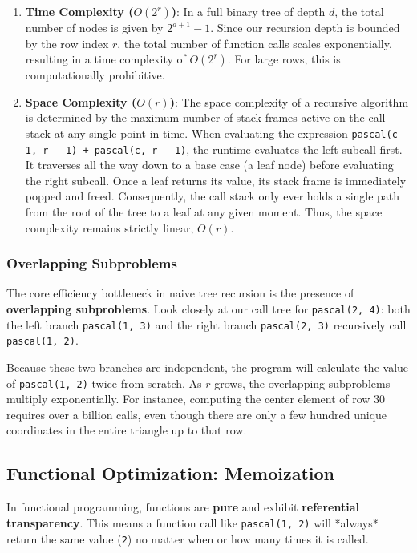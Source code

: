\begin{enumerate}
    \item \textbf{Time Complexity ($O(2^r)$)}: In a full binary tree of depth $d$, the total number of nodes is given by $2^{d+1} - 1$. Since our recursion depth is bounded by the row index $r$, the total number of function calls scales exponentially, resulting in a time complexity of $O(2^r)$. For large rows, this is computationally prohibitive.
    \item \textbf{Space Complexity ($O(r)$)}: The space complexity of a recursive algorithm is determined by the maximum number of stack frames active on the call stack at any single point in time. When evaluating the expression \texttt{pascal(c - 1, r - 1) + pascal(c, r - 1)}, the runtime evaluates the left subcall first. It traverses all the way down to a base case (a leaf node) before evaluating the right subcall. Once a leaf returns its value, its stack frame is immediately popped and freed. Consequently, the call stack only ever holds a single path from the root of the tree to a leaf at any given moment. Thus, the space complexity remains strictly linear, $O(r)$.
\end{enumerate}

\subsubsection{Overlapping Subproblems}

The core efficiency bottleneck in naive tree recursion is the presence of \textbf{overlapping subproblems}. Look closely at our call tree for \texttt{pascal(2, 4)}: both the left branch \texttt{pascal(1, 3)} and the right branch \texttt{pascal(2, 3)} recursively call \texttt{pascal(1, 2)}. 

Because these two branches are independent, the program will calculate the value of \texttt{pascal(1, 2)} twice from scratch. As $r$ grows, the overlapping subproblems multiply exponentially. 
For instance, computing the center element of row 30 requires over a billion calls, even though there are only a few hundred unique coordinates in the entire triangle up to that row.

\subsection{Functional Optimization: Memoization}

In functional programming, functions are \textbf{pure} and exhibit \textbf{referential transparency}. This means a function call like \texttt{pascal(1, 2)} will *always* return the same value (\texttt{2}) no matter when or how many times it is called.

